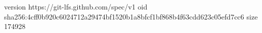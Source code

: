 version https://git-lfs.github.com/spec/v1
oid sha256:4cff0b920c6024712a29474bf1520b1a8bfcf1bf868b4f63cdd623c05efd7cc6
size 174928

